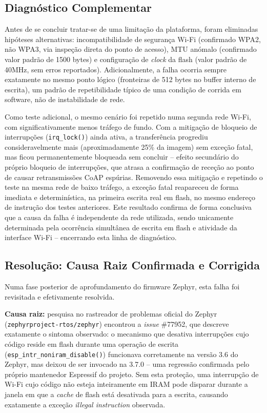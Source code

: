 \documentclass[a4paper,12pt]{article}
\begin{document}
\subsection{Diagnóstico Complementar}
Antes de se concluir tratar-se de uma limitação da plataforma, foram eliminadas hipóteses alternativas: incompatibilidade de segurança Wi-Fi (confirmado WPA2, não WPA3, via inspeção direta do ponto de acesso), MTU anómalo (confirmado valor padrão de 1500 bytes) e configuração de \textit{clock} da flash (valor padrão de 40MHz, sem erros reportados). Adicionalmente, a falha ocorria sempre exatamente no mesmo ponto lógico (fronteiras de 512 bytes no buffer interno de escrita), um padrão de repetibilidade típico de uma condição de corrida em software, não de instabilidade de rede.

Como teste adicional, o mesmo cenário foi repetido numa segunda rede Wi-Fi, com significativamente menos tráfego de fundo. Com a mitigação de bloqueio de interrupções (\texttt{irq\_lock()}) ainda ativa, a transferência progrediu consideravelmente mais (aproximadamente 25\% da imagem) sem exceção fatal, mas ficou permanentemente bloqueada sem concluir -- efeito secundário do próprio bloqueio de interrupções, que atrasa a confirmação de receção ao ponto de causar retransmissões CoAP espúrias. Removendo essa mitigação e repetindo o teste na mesma rede de baixo tráfego, a exceção fatal reapareceu de forma imediata e determinística, na primeira escrita real em flash, no mesmo endereço de instrução dos testes anteriores. Este resultado confirma de forma conclusiva que a causa da falha é independente da rede utilizada, sendo unicamente determinada pela ocorrência simultânea de escrita em flash e atividade da interface Wi-Fi -- encerrando esta linha de diagnóstico.

\subsection{Resolução: Causa Raiz Confirmada e Corrigida}
Numa fase posterior de aprofundamento do firmware Zephyr, esta falha foi revisitada e efetivamente resolvida.

\textbf{Causa raiz:} pesquisa no rastreador de problemas oficial do Zephyr (\texttt{zephyrproject-rtos/zephyr}) encontrou a \textit{issue} \#77952, que descreve exatamente o sintoma observado: o mecanismo que desativa interrupções cujo código reside em flash durante uma operação de escrita (\texttt{esp\_intr\_noniram\_disable()}) funcionava corretamente na versão 3.6 do Zephyr, mas deixou de ser invocado na 3.7.0 -- uma regressão confirmada pelo próprio mantenedor Espressif do projeto. Sem esta proteção, uma interrupção de Wi-Fi cujo código não esteja inteiramente em IRAM pode disparar durante a janela em que a \textit{cache} de flash está desativada para a escrita, causando exatamente a exceção \textit{illegal instruction} observada.
\end{document}
